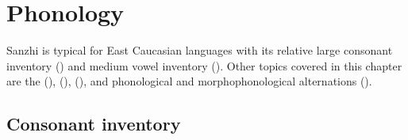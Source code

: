 \chapter{Phonology}
\label{cpt:phonology}

Sanzhi  is typical for East Caucasian languages with its relative large consonant inventory () and medium vowel inventory (). Other topics covered in this chapter are the  (),  (),  (), and phonological and morphophonological alternations (). 



\section{Consonant inventory}
\label{sec:Consonant inventory}

